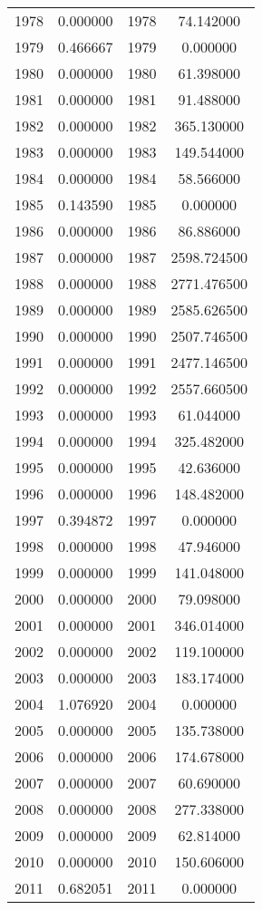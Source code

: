 \documentclass[12pt]{article}
\begin{document}
\begin{longtable}{@{}cccc@{}}
1978 & 0.000000 & 1978 & 74.142000 \\
1979 & 0.466667 & 1979 & 0.000000 \\
1980 & 0.000000 & 1980 & 61.398000 \\
1981 & 0.000000 & 1981 & 91.488000 \\
1982 & 0.000000 & 1982 & 365.130000 \\
1983 & 0.000000 & 1983 & 149.544000 \\
1984 & 0.000000 & 1984 & 58.566000 \\
1985 & 0.143590 & 1985 & 0.000000 \\
1986 & 0.000000 & 1986 & 86.886000 \\
1987 & 0.000000 & 1987 & 2598.724500 \\
1988 & 0.000000 & 1988 & 2771.476500 \\
1989 & 0.000000 & 1989 & 2585.626500 \\
1990 & 0.000000 & 1990 & 2507.746500 \\
1991 & 0.000000 & 1991 & 2477.146500 \\
1992 & 0.000000 & 1992 & 2557.660500 \\
1993 & 0.000000 & 1993 & 61.044000 \\
1994 & 0.000000 & 1994 & 325.482000 \\
1995 & 0.000000 & 1995 & 42.636000 \\
1996 & 0.000000 & 1996 & 148.482000 \\
1997 & 0.394872 & 1997 & 0.000000 \\
1998 & 0.000000 & 1998 & 47.946000 \\
1999 & 0.000000 & 1999 & 141.048000 \\
2000 & 0.000000 & 2000 & 79.098000 \\
2001 & 0.000000 & 2001 & 346.014000 \\
2002 & 0.000000 & 2002 & 119.100000 \\
2003 & 0.000000 & 2003 & 183.174000 \\
2004 & 1.076920 & 2004 & 0.000000 \\
2005 & 0.000000 & 2005 & 135.738000 \\
2006 & 0.000000 & 2006 & 174.678000 \\
2007 & 0.000000 & 2007 & 60.690000 \\
2008 & 0.000000 & 2008 & 277.338000 \\
2009 & 0.000000 & 2009 & 62.814000 \\
2010 & 0.000000 & 2010 & 150.606000 \\
2011 & 0.682051 & 2011 & 0.000000 \\

\end{longtable}
\end{document}
